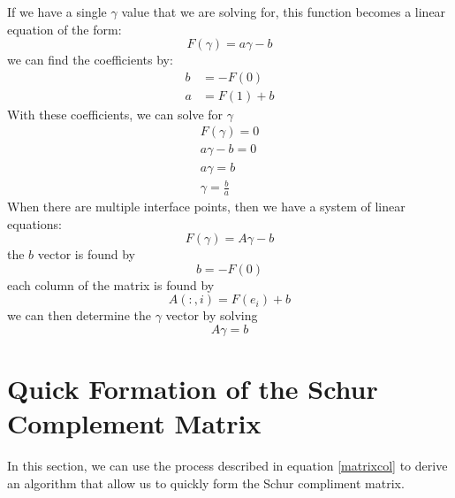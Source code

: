 \documentclass[12pt]{article}
\begin{document}
If we have a single $\gamma$ value that we are solving for, this function becomes a linear equation of the form:
\begin{equation}
F(\gamma)=a\gamma-b
\end{equation}
we can find the coefficients by:
\begin{align}
    b&=-F(0)\\
    a&=F(1)+b
\end{align}
With these coefficients, we can solve for $\gamma$
\begin{align}
F(\gamma)=0\\
a\gamma-b=0\\
a\gamma=b\\
\gamma=\frac{b}{a}
\end{align}
When there are multiple interface points, then we have a system of linear equations:
\begin{equation}
F(\gamma)=A\gamma-b
\end{equation}
the $b$ vector is found by
\begin{equation}
b=-F(0)
    \label{bvec}
\end{equation}
each column of the matrix is found by
\begin{equation}
A(:,i) = F(e_i)+b
    \label{matrixcol}
\end{equation}
we can then determine the  $\gamma$ vector by solving
\begin{equation}
A\gamma=b
\end{equation}

\section{Quick Formation of the Schur Complement Matrix}
In this section, we can use the process described in equation \eqref{matrixcol} to derive an algorithm
that allow us to quickly form the Schur compliment matrix.
\end{document}
